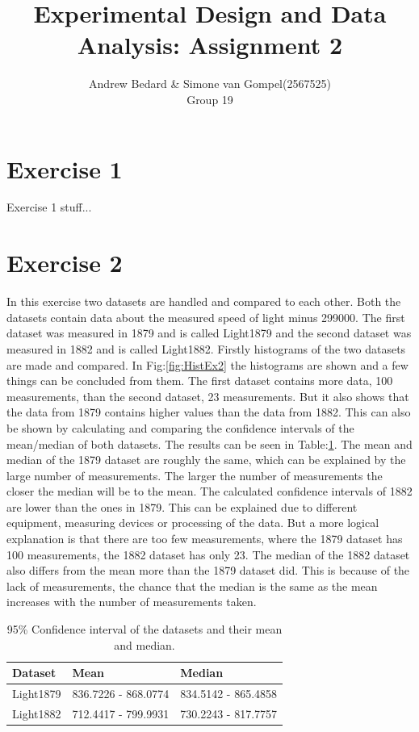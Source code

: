 \documentclass{article}
\title{Experimental Design and Data Analysis: Assignment 2}
\author{Andrew Bedard \& Simone van Gompel(2567525) \\ Group 19}
\begin{document}
  \maketitle

  \section{Exercise 1}
    Exercise 1 stuff...

  \section{Exercise 2}
    In this exercise two datasets are handled and compared to each other.
    Both the datasets contain data about the measured speed of light minus 299000.
    The first dataset was measured in 1879 and is called Light1879
    and the second dataset was measured in 1882 and is called Light1882.
    Firstly histograms of the two datasets are made and compared.
    In Fig:\ref{fig:HistEx2} the histograms are shown and a few things can be concluded from them.
    The first dataset contains more data, 100 measurements, than the second dataset, 23 measurements.
    But it also shows that the data from 1879 contains higher values than the data from 1882.
    This can also be shown by calculating and comparing the confidence intervals of the mean/median of both datasets.
    The results can be seen in Table:\ref{table:LightMeanMedian}.
    The mean and median of the 1879 dataset are roughly the same,
    which can be explained by the large number of measurements.
    The larger the number of measurements the closer the median will be to the mean.
    The calculated confidence intervals of 1882 are lower than the ones in 1879.
    This can be explained due to different equipment, measuring devices or processing of the data.
    But a more logical explanation is that there are too few measurements,
    where the 1879 dataset has 100 measurements, the 1882 dataset has only 23.
    The median of the 1882 dataset also differs from the mean more than the 1879 dataset did.
    This is because of the lack of measurements,
    the chance that the median is the same as the mean increases with the number of measurements taken.

    \begin{table}
    \begin{center}
    \begin{tabular}{l|ll}
        \hline 
        Dataset & Mean & Median \\
        \hline
        Light1879 & 836.7226 - 868.0774 & 834.5142 - 865.4858 \\
        Light1882 & 712.4417 - 799.9931 & 730.2243 - 817.7757 \\
        \hline
    \end{tabular}
    \caption{95\% Confidence interval of the datasets and their mean and median.}
    \label{table:LightMeanMedian}
    \end{center}
    \end{table}
\end{document}
